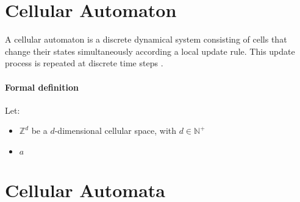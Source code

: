 \section{Cellular Automaton}
\label{ca}

A cellular automaton is a discrete dynamical system consisting of cells that change their states simultaneously according a local update rule. This update process is repeated at discrete time steps \cite{canotes}.

\paragraph{Formal definition}

Let:
\begin{itemize}
	\item $\mathds{Z}^{d}$ be a $d$-dimensional cellular space, with $d \in \mathds{N}^{+}$ 
	\item $a$

\end{itemize}



\section{Cellular Automata}
\label{automi_cellulari}

